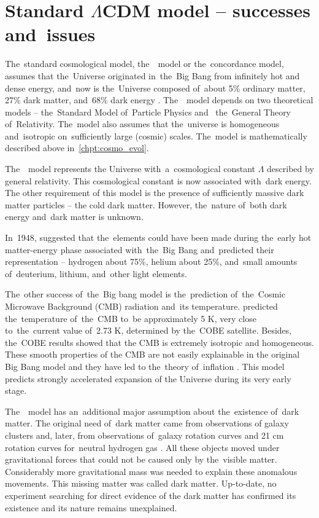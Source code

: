 \section{Standard $\Lambda$CDM model -- successes and~issues}
The~standard cosmological model, the~\LCDM\ model or the~concordance model, assumes that the~Universe originated in~the~Big Bang from infinitely hot and dense energy, and~now is the~Universe composed of~about 5\% ordinary matter, 27\% dark matter, and~68\% dark energy \parencite{redefineLCDM}. The~\LCDM\ model depends on two theoretical models -- the~Standard Model of~Particle Physics and~ the~General Theory of~Relativity. The~model also assumes that the~universe is homogeneous and~isotropic on~sufficiently large (cosmic) scales. The~model is mathematically described above in~\autoref{chpt:cosmo_evol}.

The~\LCDM\ model represents the Universe with~a~cosmological constant \(\Lambda\) described by general relativity. This cosmological constant is now associated with~dark energy. The other requirement of this model is the presence of sufficiently massive dark matter particles -- the cold dark matter. However, the~nature of~both dark energy and~dark matter is unknown.

In~1948, \textcite{PhysRev.74.505.2} suggested that the~elements could have been made during the~early hot matter-energy phase associated with~the~Big Bang and~predicted their representation -- hydrogen about 75\%, helium about 25\%, and~small amounts of~deuterium, lithium, and~other light elements.

The~other success of~the~Big bang model is the~prediction of~the~Cosmic Microwave Background (CMB) radiation and~its temperature. \textcite{1948Natur.162..774A} predicted the~temperature of~the~CMB to~be approximately 5 K, very close to~the~current value of~2.73 K, determined by the~COBE satellite. Besides, the~COBE results showed that the CMB is extremely isotropic and homogeneous. These smooth properties of the CMB are not easily explainable in the original Big Bang model and they have led to the~theory of~inflation \parencite{1981PhRvD..23..347G}. This model predicts strongly accelerated expansion of the Universe during its very early stage.

The~\LCDM\ model has an~additional major assumption about the~existence of~dark matter. The original need of~dark matter came from observations of galaxy clusters \parencite{zwicky} and, later, from observations of~galaxy rotation curves \parencite{1980ApJ...238..471R} and 21 cm rotation curves for~neutral hydrogen gas \parencite{1978PhDT.......195B}. All these objects moved under gravitational forces that could not be caused only by the~visible matter. Considerably more gravitational mass was needed to explain these anomalous movements. This missing matter was called dark matter. Up-to-date, no experiment searching for direct evidence of the dark matter has confirmed its existence and its nature remains unexplained.

